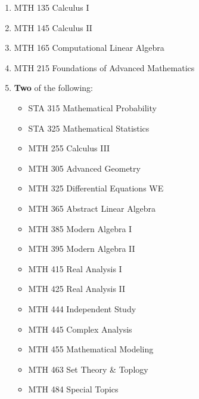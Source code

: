 \documentclass[
  letterpaper,
]{scrbook}
\providecommand{\tightlist}{%
  \setlength{\itemsep}{0pt}\setlength{\parskip}{0pt}}
\begin{document}
\begin{enumerate}
\def\labelenumi{\arabic{enumi}.}
\tightlist
\item
  MTH 135 Calculus I\\
\item
  MTH 145 Calculus II\\
\item
  MTH 165 Computational Linear Algebra\\
\item
  MTH 215 Foundations of Advanced Mathematics\\
\item
  \textbf{Two} of the following:

  \begin{itemize}
  \tightlist
  \item
    STA 315 Mathematical Probability\\
  \item
    STA 325 Mathematical Statistics\\
  \item
    MTH 255 Calculus III\\
  \item
    MTH 305 Advanced Geometry\\
  \item
    MTH 325 Differential Equations WE\\
  \item
    MTH 365 Abstract Linear Algebra\\
  \item
    MTH 385 Modern Algebra I\\
  \item
    MTH 395 Modern Algebra II\\
  \item
    MTH 415 Real Analysis I\\
  \item
    MTH 425 Real Analysis II\\
  \item
    MTH 444 Independent Study\\
  \item
    MTH 445 Complex Analysis\\
  \item
    MTH 455 Mathematical Modeling\\
  \item
    MTH 463 Set Theory \& Toplogy\\
  \item
    MTH 484 Special Topics
  \end{itemize}
\end{enumerate}
\end{document}
